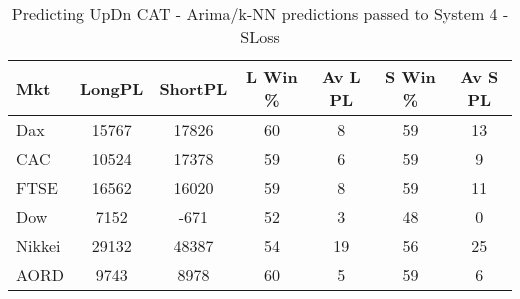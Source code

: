 \begin{table}[ht]
\centering
\caption[Predicting UpDn CAT - Arima/k-NN predictions passed to System 4 - SLoss]{Predicting UpDn CAT - Arima/k-NN predictions passed to System 4 - SLoss} 
\label{tab:chp_ts:pUD_CAT_arima_knn_sys_SL}
\begin{tabular}{lcccccc}
  \toprule Mkt & LongPL & ShortPL & L Win \% & Av L PL & S Win \% & Av S PL \\ 
  \midrule Dax & 15767 & 17826 & 60 & 8 & 59 & 13 \\ 
  CAC & 10524 & 17378 & 59 & 6 & 59 & 9 \\ 
  FTSE & 16562 & 16020 & 59 & 8 & 59 & 11 \\ 
  Dow & 7152 & -671 & 52 & 3 & 48 & 0 \\ 
  Nikkei & 29132 & 48387 & 54 & 19 & 56 & 25 \\ 
  AORD & 9743 & 8978 & 60 & 5 & 59 & 6 \\ 
   \bottomrule \end{tabular}
\end{table}
